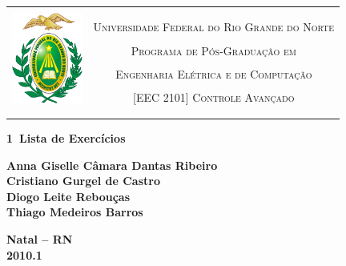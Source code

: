 \begin{titlepage}
\begin{center}

\begin{table}[h]
\centering
\setlength{\arrayrulewidth}{3.5\arrayrulewidth}
    \begin{tabular}{cc}
    \hline\\
    \multirow{5}{*}{\includegraphics[height=3cm]{imgs/ufrn_brasao}}&\\
    & \textsc{Universidade Federal do Rio Grande do Norte}\\
    & \textsc{Programa de Pós-Graduação em}\\
    & \textsc{Engenharia Elétrica e de Computação}\\
    & \textsc{[EEC 2101] Controle Avançado}\\
    &\\
    &\\
    \hline
    \end{tabular}
\end{table}


\vfill

\LARGE
\textbf{1\textordfeminine\ Lista de Exercícios}

\vfill

\normalsize
\textbf{Anna Giselle Câmara Dantas Ribeiro}\\
\textbf{Cristiano Gurgel de Castro}\\
\textbf{Diogo Leite Rebouças}\\
\textbf{Thiago Medeiros Barros}

\vfill
\textbf{Natal -- RN\\
        2010.1 }

\end{center}
\end{titlepage}
